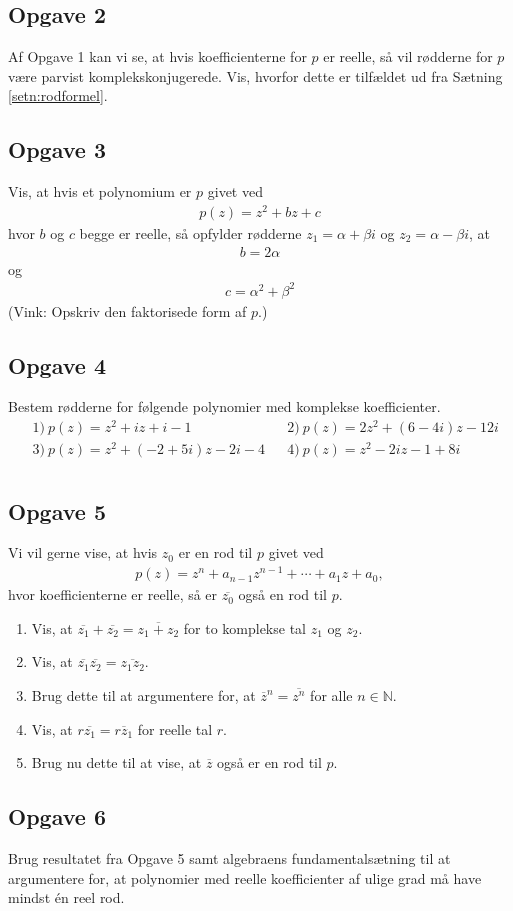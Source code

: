 \subsection*{Opgave 2}
Af Opgave 1 kan vi se, at hvis koefficienterne for $p$ er reelle, så vil rødderne for $p$ være parvist komplekskonjugerede. Vis, hvorfor dette er tilfældet ud fra Sætning \ref{setn:rodformel}.

\subsection*{Opgave 3}
Vis, at hvis et polynomium er $p$ givet ved
\begin{align*}
	p(z) = z^2 + bz + c
\end{align*}
hvor $b$ og $c$ begge er reelle, så opfylder rødderne $z_1 = \alpha + \beta i$ og $z_2 = \alpha - \beta i$, at 
\begin{align*}
	b = 2\alpha 
\end{align*}
og 
\begin{align*}
	c = \alpha^2 + \beta^2
\end{align*}
(Vink: Opskriv den faktorisede form af $p$.)

\subsection*{Opgave 4}
Bestem rødderne for følgende polynomier med komplekse koefficienter. 
\begin{align*}
	&1) \  p(z) = z^2 + iz + i -1   &&2) \ p(z) = 2z^2 + (6-4i)z - 12i  \\
	&3) \  p(z) = z^2 +(-2+5i)z -2i - 4   &&4) \ p(z) = z^2-2iz-1+8i \\ 
\end{align*}

\subsection*{Opgave 5}
Vi vil gerne vise, at hvis $z_0$ er en rod til $p$ givet ved
\begin{align*}
	p(z) = z^n + a_{n-1}z^{n-1} + \cdots + a_1z + a_0,
\end{align*}
hvor koefficienterne er reelle, så er $\overline{z_0}$ også en rod til $p$.
\begin{enumerate}[label=\roman*)]
	\item Vis, at $\overline{z_1} + \overline{z_2} = \overline{z_1 + z_2}$ for to komplekse tal $z_1$ og $z_2$.
	\item Vis, at $\overline{z_1}\overline{z_2} = \overline{z_1z_2}$.
	\item Brug dette til at argumentere for, at $\overline{z}^n = \overline{z^n}$ for alle $n \in \mathbb{N}$. 
	\item Vis, at $r\overline{z_1} = \overline{rz_1}$ for reelle tal $r$. 
	\item Brug nu dette til at vise, at $\overline{z}$ også er en rod til $p$. 
\end{enumerate}
\subsection*{Opgave 6}
Brug resultatet fra Opgave 5 samt algebraens fundamentalsætning til at argumentere for, at polynomier med reelle koefficienter af ulige grad må have mindst én reel rod. 
